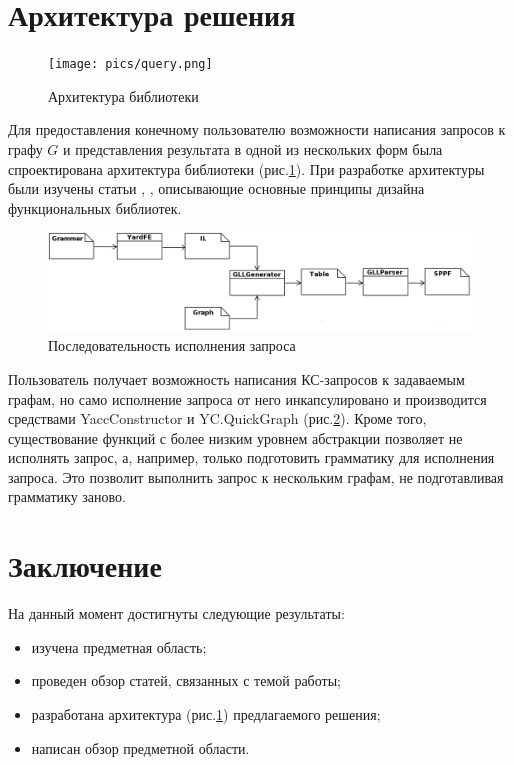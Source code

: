 \documentclass[14pt]{matmex-diploma-custom}
\begin{document}
\section{Архитектура решения}
    \begin{figure}
        \centering
        \texttt{[image: pics/query.png]}
        \caption{Архитектура библиотеки \label{arch_lib}}
    \end{figure}
    Для предоставления конечному пользователю возможности написания запросов к графу \(G\) и представления результата в одной из нескольких форм была спроектирована архитектура библиотеки (рис.\ref{arch_lib}). При разработке архитектуры были изучены статьи \cite{funcdes1}, \cite{funcdes2}, описывающие основные принципы дизайна функциональных библиотек.
    \begin{figure}
        \centering
        \includegraphics[width=\textwidth]{pics/pipeline.png}
        \caption{Последовательность исполнения запроса \label{pipeline}}
    \end{figure}
    Пользователь получает возможность написания КС-запросов к задаваемым графам, но само исполнение запроса от него инкапсулировано и производится средствами YaccConstructor и YC.QuickGraph (рис.\ref{pipeline}). Кроме того, существование функций с более низким уровнем абстракции позволяет не исполнять запрос, а, например, только подготовить грамматику для исполнения запроса. Это позволит выполнить запрос к нескольким графам, не подготавливая грамматику заново.
    
\section{Заключение}
На данный момент достигнуты следующие результаты:
\begin{itemize}
    \item изучена предметная область;
    \item проведен обзор статей, связанных с темой работы;
    \item разработана архитектура (рис.\ref{arch_lib}) предлагаемого решения;
    \item написан обзор предметной области.
\end{itemize}
        
\end{document}
